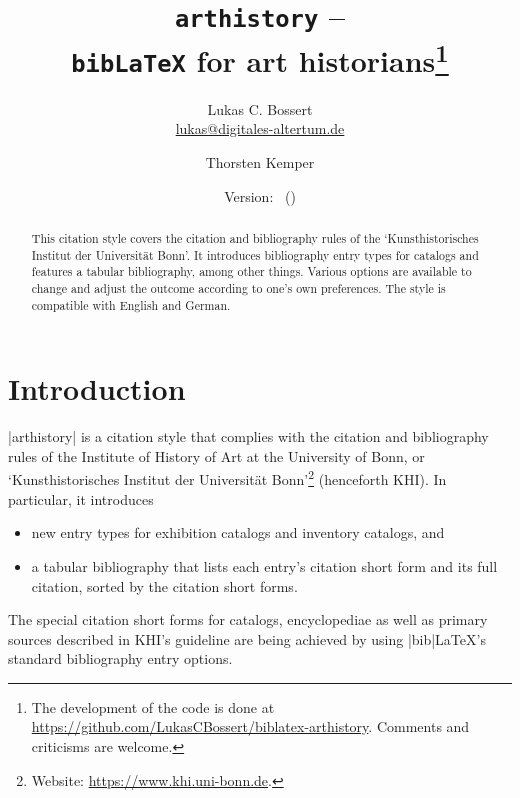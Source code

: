 \documentclass[a4paper,
10pt,
ngerman,
english
]{ltxdoc}
\begin{document}
\title{\texttt{arthistory} -- \\\texttt{bib\LaTeX} for art historians\footnote{The development of the code is done at \url{https://github.com/LukasCBossert/biblatex-arthistory}. 
Comments and criticisms are welcome.}}

\author{Lukas C. Bossert\protect\\%
{\small \href{mailto:lukas@digitales-altertum.de}{lukas@digitales-altertum.de}}
 \and Thorsten Kemper}
 
\date{Version: \arthistoryversion\ (\arthistorydate)
} 
\maketitle
 
 \begin{abstract}
\noindent This citation style covers the citation and bibliography rules of the \enquote*{Kunsthistorisches Institut der Universität Bonn}.
It introduces bibliography entry types for catalogs and features a tabular bibliography, among other things.
Various options are available to change and adjust the outcome according to one's own preferences. 
The style is compatible with English and German.
 \end{abstract}


\begin{multicols}{2}
\footnotesize\parskip=0mm \tableofcontents
\end{multicols}

\section{Introduction}
|arthistory| is a citation style that complies with the citation and bibliography rules of the Institute of History of Art at the University of Bonn, or \enquote*{Kunsthistorisches Institut der Universität Bonn}\footnote{Website: \url{https://www.khi.uni-bonn.de}.} (henceforth KHI). In particular, it introduces
\begin{itemize}
	\item new entry types for exhibition catalogs and inventory catalogs, and
	\item a tabular bibliography that lists each entry's citation short form and its full citation, sorted by the citation short forms.
\end{itemize}
The special citation short forms for catalogs, encyclopediae as well as primary sources described in KHI's guideline are being achieved by using |bib|\LaTeX{}'s standard bibliography entry options.
\end{document}
